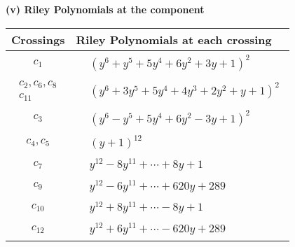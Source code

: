 \documentclass[1p]{elsarticle_modified}
\theoremstyle{definition}
\begin{document}
\newpage\renewcommand{\arraystretch}{1}
\flushleft \textbf{(v) Riley Polynomials at the component}\newline \\
\begin{tabular}{m{50pt}|m{274pt}}
Crossings & \hspace{64pt}Riley Polynomials at each crossing \\
\hline $$\begin{aligned}c_{1}\end{aligned}$$&$\begin{aligned}
&(y^6+y^5+5 y^4+6 y^2+3 y+1)^2
\end{aligned}$\\
\hline $$\begin{aligned}c_{2},c_{6},c_{8}\\c_{11}\end{aligned}$$&$\begin{aligned}
&(y^6+3 y^5+5 y^4+4 y^3+2 y^2+y+1)^2
\end{aligned}$\\
\hline $$\begin{aligned}c_{3}\end{aligned}$$&$\begin{aligned}
&(y^6- y^5+5 y^4+6 y^2-3 y+1)^2
\end{aligned}$\\
\hline $$\begin{aligned}c_{4},c_{5}\end{aligned}$$&$\begin{aligned}
&(y+1)^{12}
\end{aligned}$\\
\hline $$\begin{aligned}c_{7}\end{aligned}$$&$\begin{aligned}
&y^{12}-8 y^{11}+\cdots+8 y+1
\end{aligned}$\\
\hline $$\begin{aligned}c_{9}\end{aligned}$$&$\begin{aligned}
&y^{12}-6 y^{11}+\cdots+620 y+289
\end{aligned}$\\
\hline $$\begin{aligned}c_{10}\end{aligned}$$&$\begin{aligned}
&y^{12}+8 y^{11}+\cdots-8 y+1
\end{aligned}$\\
\hline $$\begin{aligned}c_{12}\end{aligned}$$&$\begin{aligned}
&y^{12}+6 y^{11}+\cdots-620 y+289
\end{aligned}$\\
\hline
\end{tabular}\\~\\
\end{document}
